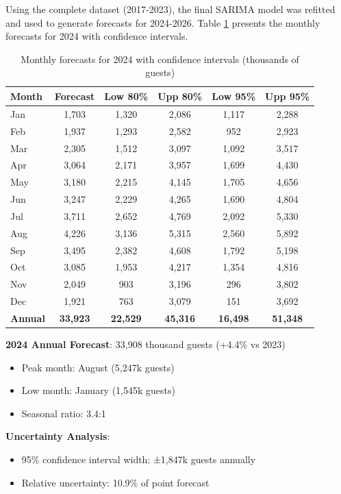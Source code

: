 \documentclass[journal]{IEEEtran}
\begin{document}
Using the complete dataset (2017-2023), the final SARIMA model was refitted and used to generate forecasts for 2024-2026. Table \ref{tab:forecasts} presents the monthly forecasts for 2024 with confidence intervals.

\begin{table}[H]
    \centering
    \caption{Monthly forecasts for 2024 with confidence intervals (thousands of guests)}
    \label{tab:forecasts}
    \begin{tabular}{lccccc}
        \toprule
        Month & Forecast & Low 80\% & Upp 80\% & Low 95\% & Upp 95\% \\
        \midrule
        Jan & 1,703 & 1,320 & 2,086 & 1,117 & 2,288 \\
        Feb & 1,937 & 1,293 & 2,582 & 952 & 2,923 \\
        Mar & 2,305 & 1,512 & 3,097 & 1,092 & 3,517 \\
        Apr & 3,064 & 2,171 & 3,957 & 1,699 & 4,430 \\
        May & 3,180 & 2,215 & 4,145 & 1,705 & 4,656 \\
        Jun & 3,247 & 2,229 & 4,265 & 1,690 & 4,804 \\
        Jul & 3,711 & 2,652 & 4,769 & 2,092 & 5,330 \\
        Aug & 4,226 & 3,136 & 5,315 & 2,560 & 5,892 \\
        Sep & 3,495 & 2,382 & 4,608 & 1,792 & 5,198 \\
        Oct & 3,085 & 1,953 & 4,217 & 1,354 & 4,816 \\
        Nov & 2,049 & 903 & 3,196 & 296 & 3,802 \\
        Dec & 1,921 & 763 & 3,079 & 151 & 3,692 \\
        \midrule
        \textbf{Annual} & \textbf{33,923} & \textbf{22,529} & \textbf{45,316} & \textbf{16,498} & \textbf{51,348} \\
        \bottomrule
    \end{tabular}
\end{table}

\textbf{2024 Annual Forecast}: 33,908 thousand guests (+4.4\% vs 2023)
\begin{itemize}
    \item Peak month: August (5,247k guests)
    \item Low month: January (1,545k guests)
    \item Seasonal ratio: 3.4:1
\end{itemize}

\textbf{Uncertainty Analysis}:
\begin{itemize}
    \item 95\% confidence interval width: ±1,847k guests annually
    \item Relative uncertainty: 10.9\% of point forecast
\end{itemize}
\end{document}
